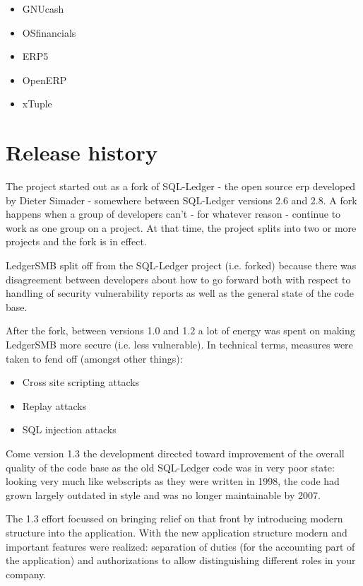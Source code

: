 \begin{itemize}
\item GNUcash
\item OSfinancials
\item ERP5
\item OpenERP
\item xTuple
\end{itemize}

\section{Release history}

The project started out as a fork of SQL-Ledger - the open source \gls{erp}
developed by Dieter Simader - somewhere between SQL-Ledger versions 2.6
and 2.8.  A fork happens when a group of developers can't - for whatever
reason - continue to work as one group on a project.  At that time, the
project splits into two or more projects and the fork is in effect.

LedgerSMB split off from the SQL-Ledger project (i.e. forked) because
there was disagreement between developers about how to go forward both with
respect to handling of security vulnerability reports as well as the general
state of the code base.

After the fork, between versions 1.0 and 1.2 a lot of energy was spent on
making LedgerSMB more secure (i.e. less vulnerable).  In technical terms,
measures were taken to fend off (amongst other things):

\begin{itemize}
\item Cross site scripting attacks
\item Replay attacks
\item SQL injection attacks
\end{itemize}

Come version 1.3 the development directed toward improvement of the overall
quality of the code base as the old SQL-Ledger code was in very poor state:
looking very much like webscripts as they were written in 1998, the code had
grown largely outdated in style and was no longer maintainable by 2007.

The 1.3 effort focussed on bringing relief on that front by introducing
modern structure into the application.  With the new application structure
modern and important features were realized: separation of duties (for the
accounting part of the application) and authorizations to allow distinguishing
different roles in your company.

